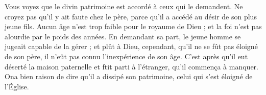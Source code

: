 Vous voyez que le divin patrimoine est accordé à ceux qui le demandent. Ne croyez pas qu’il y ait faute chez le père, parce qu’il a accédé au désir de son plus jeune fils. Aucun âge n’est trop faible pour le royaume de Dieu ; et la foi n’est pas alourdie par le poids des années. En demandant sa part, le jeune homme se jugeait capable de la gérer ; et plût à Dieu, cependant, qu’il ne se fût pas éloigné de son père, il n'eût pas connu l’inexpérience de son âge. C’est après qu’il eut déserté la maison paternelle et ftit parti à l’étranger, qu’il commença à manquer. Ona bien raison de dire qu’il a dissipé son patrimoine, celui qui s’est éloigné de l’Église.

